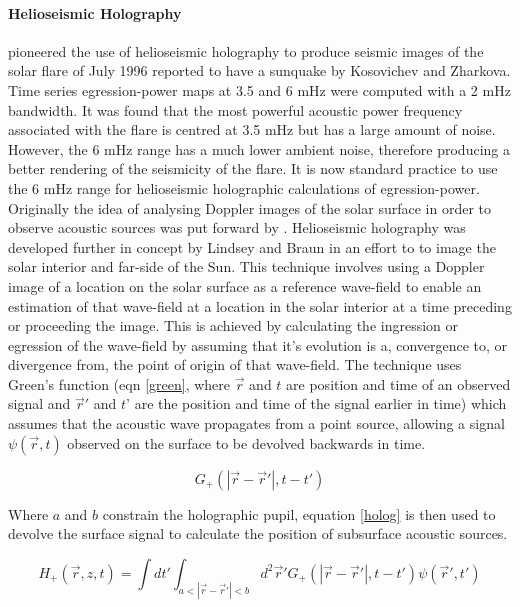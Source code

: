 \paragraph{Helioseismic Holography}\label{helioholog}
\cite{1999ApJ...513L.143D} pioneered the use of helioseismic holography to produce seismic images of the solar flare of July 1996 reported to have a sunquake by Kosovichev and Zharkova. Time series egression-power maps at 3.5 and 6 mHz were computed with a 2 mHz bandwidth. It was found that the most powerful acoustic power frequency associated with the flare is centred at 3.5 mHz but has a large amount of noise. However, the 6 mHz range has a much lower ambient noise, therefore producing a better rendering of the seismicity of the flare. It is now standard practice to use the 6 mHz range for helioseismic holographic calculations of egression-power. \\
Originally the idea of analysing Doppler images of the solar surface in order to observe acoustic sources was put forward by \cite{1975CRASB.281...93R}. Helioseismic holography was developed further in concept by Lindsey and Braun \citep{1990SoPh..126..101L, 1992ApJ...392..739B, 1997ApJ...485..895L} in an effort to to image the solar interior and far-side of the Sun. This technique involves using a Doppler image of a location on the solar surface as a reference wave-field to enable an estimation of that wave-field at a location in the solar interior at a time preceding or proceeding the image. This is achieved by calculating the ingression or egression of the wave-field by assuming that it's evolution is a, convergence to, or divergence from, the point of origin of that wave-field. The technique uses Green's function (eqn \ref{green}, where $\vec{r}$ and $t$ are position and time of an observed signal and $\vec{r}'$ and $t$' are the position and time of the signal earlier in time) which assumes that the acoustic wave propagates from a point source, allowing a signal $\psi(\vec{r},t)$ observed on the surface to be devolved backwards in time.

\begin{equation}\label{green}
G_{+}(|\vec{r}-\vec{r}'|,t-t')
\end{equation}

Where $a$ and $b$ constrain the holographic pupil, equation \ref{holog} is then used to devolve the surface signal to calculate the position of subsurface acoustic sources.

\begin{equation}\label{holog}
H_{+}(\vec{r},z,t)= \int dt'  \int_{a<|\vec{r}-\vec{r}'|<b} d^{2}\vec{r}'G_{+}(|\vec{r}-\vec{r}'|,t-t')\psi(\vec{r}',t')
\end{equation}

